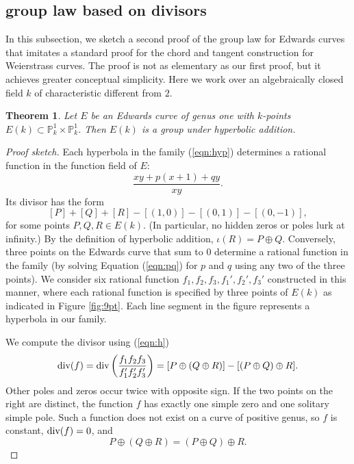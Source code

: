 \documentclass[12pt]{article}
\newtheorem{theorem}{Theorem}[subsection]
\newcommand{\ring}[1]{\mathbb{#1}}
\newcommand{\op}[1]{\hbox{#1}}
\begin{document}
\subsection{group law based on divisors}

In this subsection, we sketch a second proof of the group law for
Edwards curves that imitates a standard proof for the chord and
tangent construction for Weierstrass curves.  The proof is not
as elementary as our first proof, but it achieves greater conceptual simplicity.
Here we work over an algebraically closed field $k$ of characteristic
different from $2$.

\begin{theorem} Let $E$ be an Edwards curve of genus one with
  $k$-points $E(k)\subset \ring{P}_k^1\times \ring{P}_k^1$.  Then
  $E(k)$ is a group under hyperbolic addition.
\end{theorem}

\begin{proof}[Proof sketch] 
  Each hyperbola in the family (\ref{eqn:hyp}) determines a rational
  function in the function field of $E$:
\[
\frac{x y + p (x+1) + q y}{x y}.
\]
Its divisor has the form
\begin{equation}\label{eqn:h}
[P] + [Q] + [R] - [(1,0)] - [(0,1)] - [(0,-1)],
\end{equation}
for some points $P,Q,R\in E(k)$.  (In particular, no  hidden zeros or
poles lurk at infinity.)  By the definition of hyperbolic
addition, $\iota(R) = P\oplus Q$.  Conversely, three points on the Edwards
curve that sum to $0$ determine a rational function in the family (by solving
Equation (\ref{eqn:pq}) for $p$ and $q$ using any two of the three points). We
consider six rational function $f_1,f_2,f_3,f_1',f_2',f_3'$
constructed in this manner, where each rational function is specified
by three points of $E(k)$ as indicated in Figure {\ref{fig:9pt}}.  Each line
segment in the figure represents a hyperbola in our family.

We compute the divisor using (\ref{eqn:h})
\[
\op{div} (f) =\op{div}\left(\frac{f_1 f_2 f_3}{f_1' f_2' f_3'}\right) = 
[P\oplus (Q\oplus R)] - [(P\oplus Q) \oplus R].
\]
Other poles and zeros occur twice with opposite sign.
If the two points on the right are distinct, the function $f$ has exactly one
simple zero and one solitary simple pole.  Such a function does not
exist on a curve of positive genus, so $f$ is constant, $\op{div}(f)=0$, and
\[
P\oplus (Q\oplus R) = (P\oplus Q) \oplus R.
\]
\end{proof}
\end{document}
